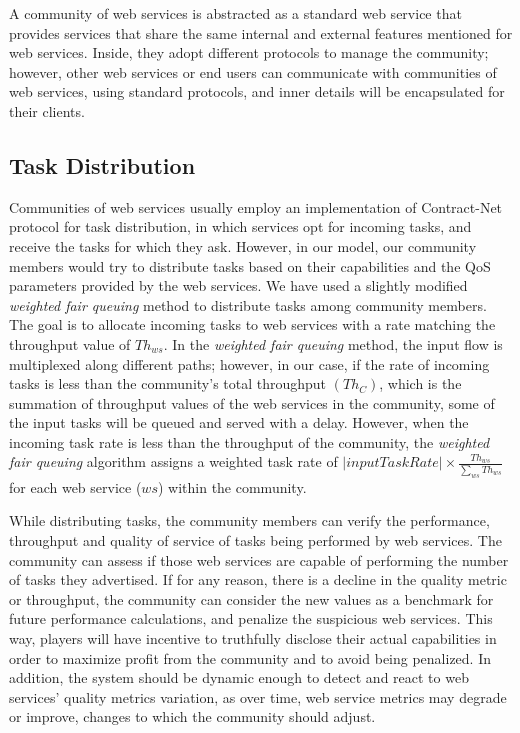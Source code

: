 \documentclass[10pt,journal,cspaper,compsoc]{IEEEtran}
\begin{document}
A community of web services is abstracted as a standard web service that provides services that share the same internal and external features mentioned for web services. Inside, they adopt different protocols to manage the community; however, other web services or end users can communicate with communities of web services, using standard protocols, and inner details will be encapsulated for their clients.

\subsection{Task Distribution}

Communities of web services usually employ an implementation of Contract-Net protocol for task distribution, in which services opt for incoming tasks, and receive the tasks for which they ask. However, in our model, our community members would try to distribute tasks based on their capabilities and the QoS parameters provided by the web services. We have used a slightly modified \emph{weighted fair queuing} method to distribute tasks among community members. The goal is to allocate incoming tasks to web services with a rate matching the throughput value of $Th_{ws}$. In the \emph{weighted fair queuing} method, the input flow is multiplexed along different paths; however, in our case, if the rate of incoming tasks is less than the community's total throughput $(Th_{C})$, which is the summation of throughput values of the web services in the community, some of the input tasks will be queued and served with a delay. 
However, when the incoming task rate is less than the throughput of the community, the \emph{weighted fair queuing} algorithm assigns a weighted task rate of $|input Task Rate| \times \frac{Th_{ws}}{\sum_{ws}{Th_{ws}}}$ for each web service ($ws$) within the community.

While distributing tasks, the community members can verify the performance, throughput and quality of service of tasks being performed by web services. The community can assess if those web services are capable of performing the number of tasks they advertised. If for any reason, there is a decline in the quality metric or throughput, the community can consider the new values as a benchmark for future performance calculations, and penalize the suspicious web services. This way, players will have incentive to truthfully disclose their actual capabilities in order to maximize profit from the community and to avoid being penalized. In addition, the system should be dynamic enough to detect and react to web services' quality metrics variation, as over time, web service metrics may degrade or improve, changes to which the community should adjust.
\end{document}
